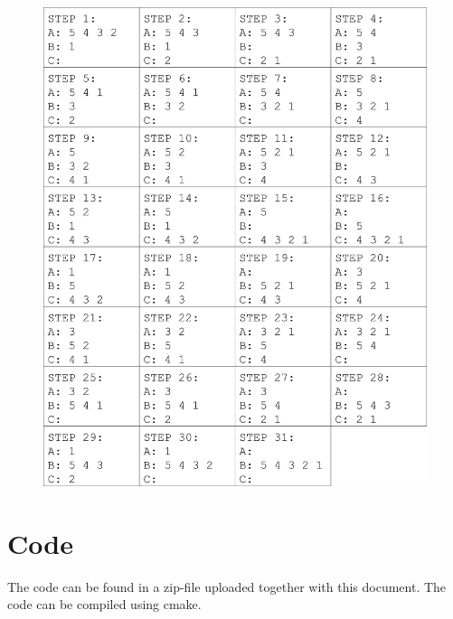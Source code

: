 \documentclass[a4paper,12pt,danish]{article}
\begin{document}
    \begin{figure}[H]     
    	\centering
    	\includegraphics[width=\textwidth]{steps.jpg}
    	\caption{}
    	\label{steps}
    \end{figure}
    
\section{Code}
The code can be found in a zip-file uploaded together with this document.
The code can be compiled using cmake.
\end{document}
